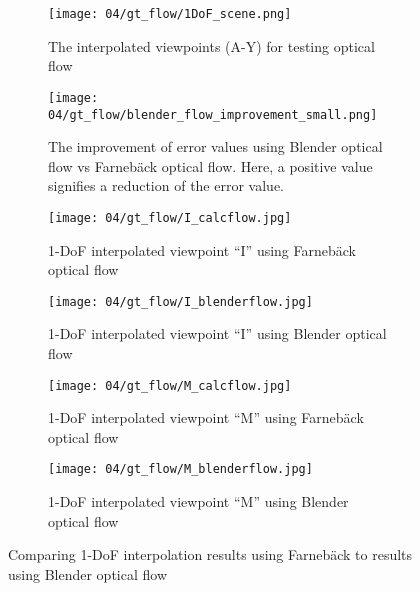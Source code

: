 \begin{figure}
\centering
    \hfill
    \begin{subfigure}[c]{0.4\textwidth}
            \centering
            \texttt{[image: 04/gt\_flow/1DoF\_scene.png]}
            \caption{The interpolated viewpoints (A-Y) for testing optical flow}
    \end{subfigure}
    \hfill
    \begin{subfigure}[c]{0.4\textwidth}
            \centering
            \texttt{[image: 04/gt\_flow/blender\_flow\_improvement\_small.png]}
            \caption{The improvement of error values using Blender optical flow vs Farneb\"ack optical flow. Here, a positive value signifies a reduction of the error value.}
    \end{subfigure}
    \hfill
    \hfill
\par\bigskip
    \hfill
    \begin{subfigure}[b]{0.4\textwidth}
            \centering
            \texttt{[image: 04/gt\_flow/I\_calcflow.jpg]}
            \caption{1-DoF interpolated viewpoint ``I'' using Farneb\"ack optical flow}
    \end{subfigure}
    \hfill
    \begin{subfigure}[b]{0.4\textwidth}
            \centering
            \texttt{[image: 04/gt\_flow/I\_blenderflow.jpg]}
            \caption{1-DoF interpolated viewpoint ``I'' using Blender optical flow}
    \end{subfigure}
    \hfill
    \hfill
\par\bigskip
    \hfill
    \begin{subfigure}[b]{0.4\textwidth}
            \centering
            \texttt{[image: 04/gt\_flow/M\_calcflow.jpg]}
            \caption{1-DoF interpolated viewpoint ``M'' using Farneb\"ack optical flow}
    \end{subfigure}
    \hfill
    \begin{subfigure}[b]{0.4\textwidth}
            \centering
            \texttt{[image: 04/gt\_flow/M\_blenderflow.jpg]}
            \caption{1-DoF interpolated viewpoint ``M'' using Blender optical flow}
    \end{subfigure}
    \hfill
    \hfill
  \caption[Comparing 1-DoF interpolation results using calculated vs Blender optical flow]{Comparing 1-DoF interpolation results using Farneb\"ack to results using Blender optical flow} \label{fig:of_comparison}
\end{figure}

